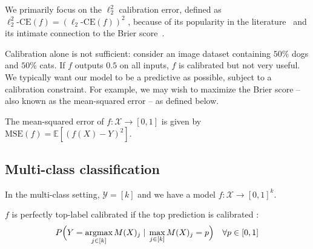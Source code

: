 
We primarily focus on the $\ell_2^2$ calibration error, defined as $\ell_2^2\mbox{-CE}(f) = (\ell_2\mbox{-CE}(f))^2$ , because of its popularity in the literature~\cite{nguyen2015posterior, hendrycks2019anomaly, kuleshov2015calibrated, hendrycks2019pretraining} and its intimate  connection to the Brier score~\cite{murphy1973vector,degroot1983forecasters}.

Calibration alone is not sufficient: consider an image dataset containing $50\%$ dogs and $50\%$ cats.
If $f$ outputs $0.5$ on all inputs, $f$ is calibrated but not very useful.
We typically want our model to be a predictive as possible, subject to a calibration constraint.
For example, we may wish to maximize the Brier score -- also known as the mean-squared error -- as defined below.

\begin{definition}
The mean-squared error of $f : \mathcal{X} \to [0, 1]$ is given by $\mbox{MSE}(f) = \mathbb{E}[(f(X) - Y)^2]$.
\end{definition}

\subsection{Multi-class classification}

In the multi-class setting, $\mathcal{Y} = [k]$ 
and we have a model $f : \mathcal{X} \to [0, 1]^k$.

\begin{definition}
$f$ is perfectly top-label calibrated if the top prediction is calibrated :
\[ P\Big(Y = \mathop{\mbox{argmax}}_{j \in [k]} M(X)_j \; | \; \max_{j \in [k]} M(X)_j = p\Big) \quad \forall p \in [0, 1] \]
\end{definition}

